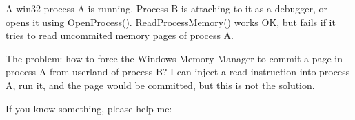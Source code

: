 \myhrule{}

A win32 process A is running.
Process B is attaching to it as a debugger, or opens it using OpenProcess().
ReadProcessMemory() works OK, but fails if it tries to read uncommited memory pages of process A.

The problem: how to force the Windows Memory Manager to commit a page in process A from userland of process B?
I can inject a read instruction into process A, run it, and the page would be committed, but this is not the solution.

\myhrule{}

If you know something, please help me: \EMAIL{}

